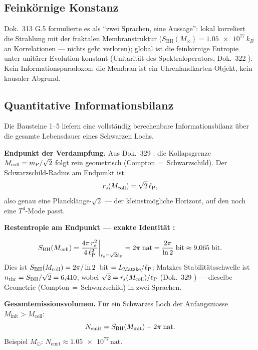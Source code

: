 \subsection{Feinkörnige Konstanz}

Dok.\ 313 G.5 formulierte es als \enquote{zwei Sprachen, eine Aussage}:
lokal korreliert die Strahlung mit der fraktalen Membranstruktur
($S_{\mathrm{BH}}(M_\odot) = \num{1.05e77}\,k_B$ an Korrelationen —
nichts geht verloren); global ist die feinkörnige Entropie unter
unitärer Evolution konstant (Unitarität des Spektraloperators,
Dok.\ 322 \K). Kein Informationsparadoxon: die Membran ist ein
Uhrenlandkarten-Objekt, kein kausaler Abgrund.

\subsection{Quantitative Informationsbilanz \B}
\label{sec:infobilanz}

Die Bausteine 1--5 liefern eine vollständig berechenbare
Informationsbilanz über die gesamte Lebensdauer eines Schwarzen Lochs.

\textbf{Endpunkt der Verdampfung.}
Aus Dok.~329 \B: die Kollapsgrenze $M_{\mathrm{coll}} = m_{\mathrm{P}}/\sqrt{2}$
folgt rein geometrisch (Compton\,$=$\,Schwarzschild).
Der Schwarzschild-Radius am Endpunkt ist
\begin{equation}
  r_{\mathrm{s}}(M_{\mathrm{coll}}) = \sqrt{2}\,\ell_{\mathrm{P}},
\end{equation}
also genau eine Plancklänge$\cdot\sqrt{2}$ — der kleinstmögliche
Horizont, auf den noch eine $T^4$-Mode passt.

\textbf{Restentropie am Endpunkt — exakte Identität \B:}
\begin{tcolorbox}[ffgftbox,title={Hauptresultat R93 \B}]
  \begin{equation}
    S_{\mathrm{BH}}(M_{\mathrm{coll}})
    = \frac{4\pi\,r_{\mathrm{s}}^2}{4\,\ell_{\mathrm{P}}^2}\bigg|_{r_{\mathrm{s}}=\sqrt{2}\ell_{\mathrm{P}}}
    = 2\pi \;\text{nat}
    = \frac{2\pi}{\ln 2} \;\text{bit}
    \approx 9{,}065\;\text{bit}.
  \end{equation}
  Dies ist $S_{\mathrm{BH}}(M_{\mathrm{coll}}) = 2\pi/\ln 2$~bit $= L_{\mathrm{Matzke}}/\ell_{\mathrm{P}}$;
  Matzkes Stabilitätsschwelle ist $n_{\mathrm{thr}} = S_{\mathrm{BH}}/\sqrt{2} = 6{,}410$,
  wobei $\sqrt{2} = r_{\mathrm{s}}(M_{\mathrm{coll}})/\ell_{\mathrm{P}}$ (Dok.~329 \B) —
  dieselbe Geometrie (Compton\,$=$\,Schwarzschild) in zwei Sprachen.
\end{tcolorbox}

\textbf{Gesamtemissionsvolumen.} Für ein Schwarzes Loch der
Anfangsmasse $M_{\mathrm{init}} > M_{\mathrm{coll}}$:
\begin{equation}
  N_{\mathrm{emit}}
  = S_{\mathrm{BH}}(M_{\mathrm{init}}) - 2\pi \;\text{nat}.
\end{equation}
Beispiel $M_\odot$: $N_{\mathrm{emit}} \approx \num{1.05e77}\,\text{nat}$.

